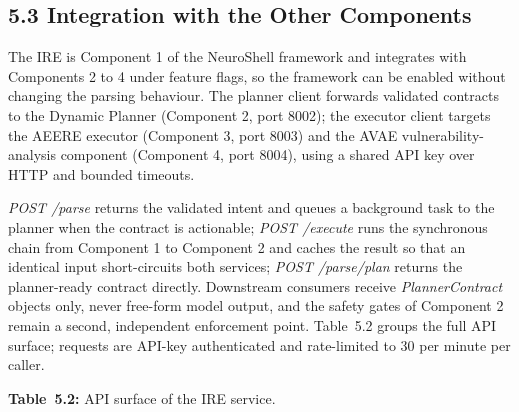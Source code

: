 \documentclass[
]{article}
\begin{document}
\hypertarget{integration-with-the-other-components}{%
\subsection{5.3 Integration with the Other
Components}\label{integration-with-the-other-components}}

The IRE is Component 1 of the NeuroShell framework and integrates with
Components 2 to 4 under feature flags, so the framework can be enabled
without changing the parsing behaviour. The planner client forwards
validated contracts to the Dynamic Planner (Component 2, port 8002); the
executor client targets the AEERE executor (Component 3, port 8003) and
the AVAE vulnerability-analysis component (Component 4, port 8004),
using a shared API key over HTTP and bounded timeouts.

\emph{POST /parse} returns the validated intent and queues a background
task to the planner when the contract is actionable; \emph{POST
/execute} runs the synchronous chain from Component 1 to Component 2 and
caches the result so that an identical input short-circuits both
services; \emph{POST /parse/plan} returns the planner-ready contract
directly. Downstream consumers receive \emph{PlannerContract} objects
only, never free-form model output, and the safety gates of Component 2
remain a second, independent enforcement point. Table~5.2 groups the
full API surface; requests are API-key authenticated and rate-limited to
30 per minute per caller.

\protect\hypertarget{_Toc900108}{}{}\textbf{Table~5.2:} API surface of
the IRE service.
\end{document}
